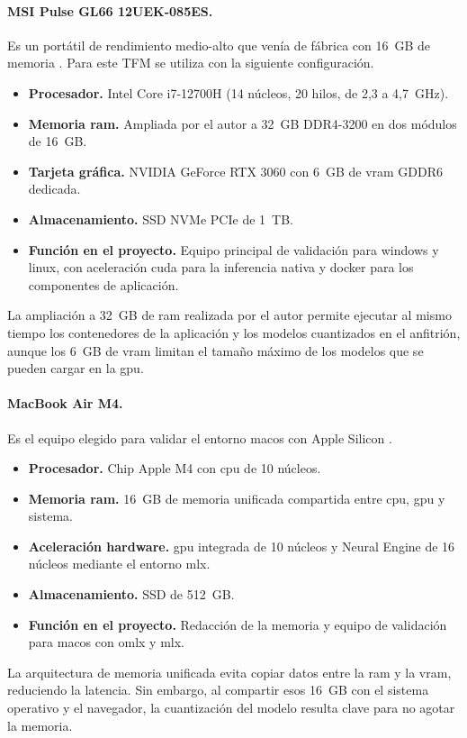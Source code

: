 \paragraph{MSI Pulse GL66 12UEK-085ES.}
Es un portátil de rendimiento medio-alto que venía de fábrica con 16~GB de memoria \cite{MSIPulseGL66}. Para este TFM se utiliza con la siguiente configuración.
\begin{itemize}[leftmargin=*,nosep]
    \item \textbf{Procesador.} Intel Core i7-12700H (14 núcleos, 20 hilos, de 2,3 a 4,7~GHz).
    \item \textbf{Memoria \gls{ram}.} Ampliada por el autor a 32~GB DDR4-3200 en dos módulos de 16~GB.
    \item \textbf{Tarjeta gráfica.} NVIDIA GeForce RTX 3060 con 6~GB de \gls{vram} GDDR6 dedicada.
    \item \textbf{Almacenamiento.} SSD NVMe PCIe de 1~TB.
    \item \textbf{Función en el proyecto.} Equipo principal de validación para \gls{windows} y \gls{linux}, con aceleración \gls{cuda} para la inferencia nativa y \gls{docker} para los componentes de aplicación.
\end{itemize}
La ampliación a 32~GB de \gls{ram} realizada por el autor permite ejecutar al mismo tiempo los contenedores de la aplicación y los modelos cuantizados en el anfitrión, aunque los 6~GB de \gls{vram} limitan el tamaño máximo de los modelos que se pueden cargar en la \gls{gpu}.

\paragraph{MacBook Air M4.}
Es el equipo elegido para validar el entorno \gls{macos} con Apple Silicon \cite{apple2025macbookair}.
\begin{itemize}[leftmargin=*,nosep]
    \item \textbf{Procesador.} Chip Apple M4 con \gls{cpu} de 10 núcleos.
    \item \textbf{Memoria \gls{ram}.} 16~GB de memoria unificada compartida entre \gls{cpu}, \gls{gpu} y sistema.
    \item \textbf{Aceleración hardware.} \Gls{gpu} integrada de 10 núcleos y Neural Engine de 16 núcleos mediante el entorno \gls{mlx}.
    \item \textbf{Almacenamiento.} SSD de 512~GB.
    \item \textbf{Función en el proyecto.} Redacción de la memoria y equipo de validación para \gls{macos} con \gls{omlx} y \gls{mlx}.
\end{itemize}
La arquitectura de memoria unificada evita copiar datos entre la \gls{ram} y la \gls{vram}, reduciendo la latencia. Sin embargo, al compartir esos 16~GB con el sistema operativo y el navegador, la cuantización del modelo resulta clave para no agotar la memoria.

